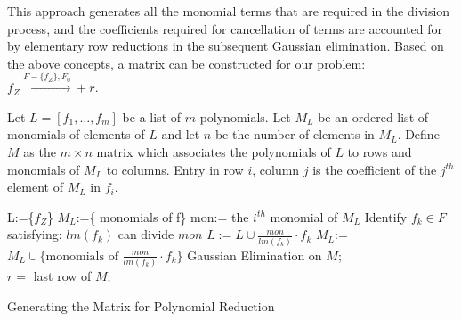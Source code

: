 This approach generates all the monomial terms that are required
in the division process, 
and the coefficients required for cancellation of terms are accounted
for by elementary row reductions in the subsequent Gaussian elimination. 
Based on the above concepts, a matrix can be constructed for our
problem: $f_Z \xrightarrow{F-\{f_Z\},F_0}+r$. 

\begin{Definition}
Let $L = \left [f_1, \dots, f_m \right]$ be a list of $m$ polynomials. Let
$M_L$ be an ordered list of monomials of elements of $L$ and let $n$
be the number of elements in $M_L$. Define $M$ as the $m \times n$
matrix which associates the polynomials of $L$ to rows and monomials
of $M_L$ to columns. Entry in row $i$, column $j$ is the coefficient of the
$j^{th}$ element of $M_L$ in $f_i$. 
\end{Definition}

\begin{algorithm}[hbt]
\SetAlgoNoLine

        L:=\{$f_Z$\} \;{}
        $M_{L}$:=\{ monomials of f\} \;{}
        {
                mon:= the $i^{th}$ monomial of $M_{L}$\;
                Identify $f_{k} \in F$ satisfying: $lm(f_{k})$ can divide $mon$ \;
                $L:=L \cup \frac{mon}{lm(f_{k})}\cdot f_{k}$ \;
                $M_{L}$:=$M_{L} \cup \{ \text{monomials of }
                \frac{mon}{lm(f_{k})}\cdot f_{k}\}$ \;{} 
        }
         Gaussian Elimination on $M$;\\
         \Return $r =$ last row of $M$;
\caption{Generating the Matrix for Polynomial Reduction}\label{alg:matrix}
\end{algorithm}

